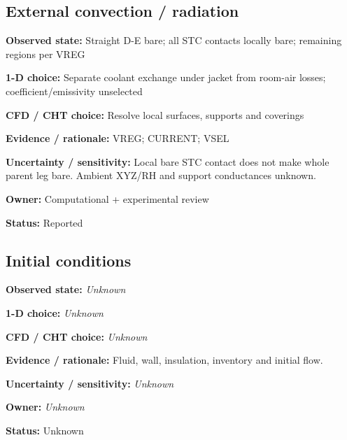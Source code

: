 \documentclass[11pt]{article}
\begin{document}
\par\noindent\begin{minipage}{\textwidth}\small\setlength{\parskip}{2pt}
\subsection*{External convection / radiation}
\textbf{Observed state:} Straight D-E bare; all STC contacts locally bare; remaining regions per VREG\par
\textbf{1-D choice:} Separate coolant exchange under jacket from room-air losses; coefficient/emissivity unselected\par
\textbf{CFD / CHT choice:} Resolve local surfaces, supports and coverings\par
\textbf{Evidence / rationale:} VREG; CURRENT; VSEL\par
\textbf{Uncertainty / sensitivity:} Local bare STC contact does not make whole parent leg bare. Ambient XYZ/RH and support conductances unknown.\par
\textbf{Owner:} Computational + experimental review\par
\textbf{Status:} Reported\par
\end{minipage}\par\vspace{5pt}
\par\noindent\begin{minipage}{\textwidth}\small\setlength{\parskip}{2pt}
\subsection*{Initial conditions}
\textbf{Observed state:} \textit{Unknown}\par
\textbf{1-D choice:} \textit{Unknown}\par
\textbf{CFD / CHT choice:} \textit{Unknown}\par
\textbf{Evidence / rationale:} Fluid, wall, insulation, inventory and initial flow.\par
\textbf{Uncertainty / sensitivity:} \textit{Unknown}\par
\textbf{Owner:} \textit{Unknown}\par
\textbf{Status:} Unknown\par
\end{minipage}\par\vspace{5pt}
\end{document}
